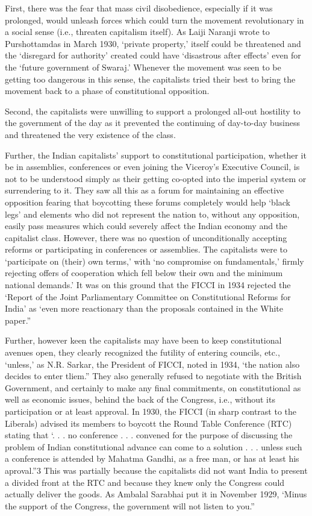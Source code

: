 First, there was the fear that mass civil disobedience, especially if it was prolonged, would unleash forces which could turn the movement revolutionary in a social sense (i.e., threaten capitalism itself). As Laiji Naranji wrote to Purshottamdas in March 1930, ‘private property,’ itself could be threatened and the ‘disregard for authority’ created could have ‘disastrous after effects’ even for the ‘future government of Swaraj.’ Whenever the movement was seen to be getting too dangerous in this sense, the capitalists tried their best to bring the movement back to a phase of constitutional opposition. 

Second, the capitalists were unwilling to support a prolonged all-out hostility to the government of the day as it prevented the continuing of day-to-day business and threatened the very existence of the class. 

Further, the Indian capitalists’ support to constitutional participation, whether it be in assemblies, conferences or even joining the Viceroy’s Executive Council, is not to be understood simply as their getting co-opted into the imperial system or surrendering to it. They saw all this as a forum for maintaining an effective opposition fearing that boycotting these forums completely would help ‘black legs’ and elements who did not represent the nation to, without any opposition, easily pass measures which could severely affect the Indian economy and the capitalist class. However, there was no question of unconditionally accepting reforms or participating in conferences or assemblies. The capitalists were to ‘participate on (their) own terms,’ with ‘no compromise on fundamentals,’ firmly rejecting offers of cooperation which fell below their own and the minimum national demands.’ It was on this ground that the FICCI in 1934 rejected the ‘Report of the Joint Parliamentary Committee on Constitutional Reforms for India’ as ‘even more reactionary than the proposals contained in the White paper.” 

Further, however keen the capitalists may have been to keep constitutional avenues open, they clearly recognized the futility of entering councils, etc., ‘unless,’ as N.R. Sarkar, the President of FICCI, noted in 1934, ‘the nation also decides to enter tliem.” They also generally refused to negotiate with the British Government, and certainly to make any final commitments, on constitutional as well as economic issues, behind the back of the Congress, i.e., without its participation or at least approval. In 1930, the FICCI (in sharp contrast to the Liberals) advised its members to boycott the Round Table Conference (RTC) stating that ‘. . . no conference . . . convened for the purpose of discussing the problem of Indian constitutional advance can come to a solution . . . unless such a conference is attended by Mahatma Gandhi, as a free man, or has at least his aproval.”3 This was partially because the capitalists did not want India to present a divided front at the RTC and because they knew only the Congress could actually deliver the goods. As Ambalal Sarabhai put it in November 1929, ‘Minus the support of the Congress, the government will not listen to you.” 

